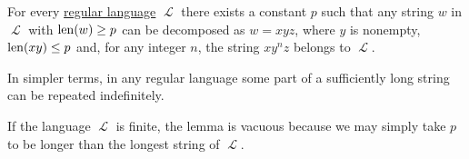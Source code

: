 \begin{lemma}\label{thm:regular_pumping_lemma}
  For every \hyperref[def:chomsky_hierarchy/regular]{regular language} \( \mscrL \) there exists a constant \( p \) such that any string \( w \) in \( \mscrL \) with \( \operatorname{len}(w) \geq p \) can be decomposed as \( w = x y z \), where \( y \) is nonempty, \( \operatorname{len}(xy) \leq p \) and, for any  integer \( n \), the string \( x y^n z \) belongs to \( \mscrL \).
\end{lemma}
\begin{comments}
  \item In simpler terms, in any regular language some part of a sufficiently long string can be repeated indefinitely.
  \item If the language \( \mscrL \) is finite, the lemma is vacuous because we may simply take \( p \) to be longer than the longest string of \( \mscrL \).
\end{comments}
